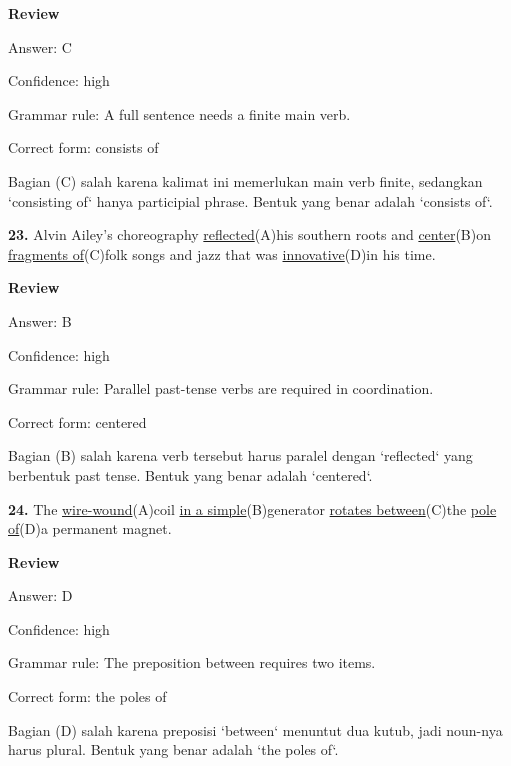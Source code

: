 \documentclass[12pt]{article}
\begin{document}
\par
\begingroup
\setlength{\parskip}{0pt}
\setlength{\parindent}{0pt}
\textbf{Review}\par
Answer: C\par
Confidence: high\par
Grammar rule: A full sentence needs a finite main verb.\par
Correct form: consists of\par
Bagian (C) salah karena kalimat ini memerlukan main verb finite, sedangkan `consisting of` hanya participial phrase. Bentuk yang benar adalah `consists of`.\par
\endgroup
\par
\vspace{\questionblockgap}
\noindent\textbf{23.} Alvin Ailey's choreography \uline{reflected}(A)his southern roots and \uline{center}(B)on \uline{fragments of}(C)folk songs and jazz that was \uline{innovative}(D)in his time.
\par
\begingroup
\setlength{\parskip}{0pt}
\setlength{\parindent}{0pt}
\textbf{Review}\par
Answer: B\par
Confidence: high\par
Grammar rule: Parallel past-tense verbs are required in coordination.\par
Correct form: centered\par
Bagian (B) salah karena verb tersebut harus paralel dengan `reflected` yang berbentuk past tense. Bentuk yang benar adalah `centered`.\par
\endgroup
\par
\vspace{\questionblockgap}
\noindent\textbf{24.} The \uline{wire-wound}(A)coil \uline{in a simple}(B)generator \uline{rotates between}(C)the \uline{pole of}(D)a permanent magnet.
\par
\begingroup
\setlength{\parskip}{0pt}
\setlength{\parindent}{0pt}
\textbf{Review}\par
Answer: D\par
Confidence: high\par
Grammar rule: The preposition between requires two items.\par
Correct form: the poles of\par
Bagian (D) salah karena preposisi `between` menuntut dua kutub, jadi noun-nya harus plural. Bentuk yang benar adalah `the poles of`.\par
\endgroup
\par
\vspace{\questionblockgap}
\end{document}
